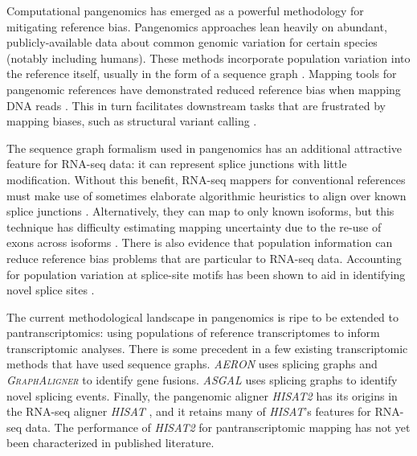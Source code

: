 \documentclass[11pt]{ucthesis}
\newcommand{\tool}[1]{\emph{\textsc{#1}}}
\begin{document}
Computational pangenomics has emerged as a powerful methodology for mitigating reference bias. Pangenomics approaches lean heavily on abundant, publicly-available data about common genomic variation for certain species (notably including humans). These methods incorporate population variation into the reference itself, usually in the form of a sequence graph \cite{computational2018computational,eizenga2020pangenome}. Mapping tools for pangenomic references have demonstrated reduced reference bias when mapping DNA reads \cite{garrison2018variation,rakocevic2019fast,chen2021reference}. This in turn facilitates downstream tasks that are frustrated by mapping biases, such as structural variant calling \cite{hickey2020genotyping,sibbesen2018accurate}.

The sequence graph formalism used in pangenomics has an additional attractive feature for RNA-seq data: it can represent splice junctions with little modification. Without this benefit, RNA-seq mappers for conventional references must make use of sometimes elaborate algorithmic heuristics to align over known splice junctions \cite{dobin2013star,wu2016gmap}. Alternatively, they can map to only known isoforms, but this technique has difficulty estimating mapping uncertainty due to the re-use of exons across isoforms \cite{langmead2012fast}. There is also evidence that population information can reduce reference bias problems that are particular to RNA-seq data. Accounting for population variation at splice-site motifs has been shown to aid in identifying novel splice sites \cite{stein2015discover}. 

The current methodological landscape in pangenomics is ripe to be extended to pantranscriptomics: using populations of reference transcriptomes to inform transcriptomic analyses. There is some precedent in a few existing transcriptomic methods that have used sequence graphs. \tool{AERON} \cite{rautiainen2020aeron} uses splicing graphs and \tool{GraphAligner} \cite{rautiainen2020graphaligner} to identify gene fusions. \tool{ASGAL} \cite{denti2018asgal} uses splicing graphs to identify novel splicing events. Finally, the pangenomic aligner \tool{HISAT2} \cite{kim2019graph} has its origins in the RNA-seq aligner \tool{HISAT} \cite{kim2015hisat}, and it retains many of \tool{HISAT}'s features for RNA-seq data. The performance of \tool{HISAT2} for pantranscriptomic mapping has not yet been characterized in published literature. 
\end{document}
